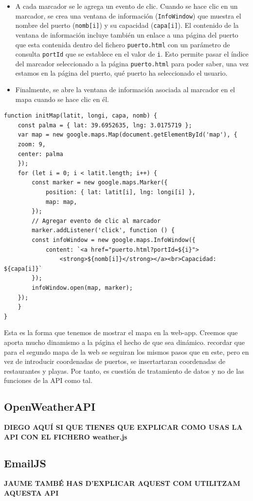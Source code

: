 \documentclass{article}
\begin{document}
\begin{enumerate}
\begin{itemize}
        \item A cada marcador se le agrega un evento de clic. Cuando se hace clic en un marcador, se crea una ventana de información (\texttt{InfoWindow}) que muestra el nombre del puerto (\texttt{nomb[i]}) y su capacidad (\texttt{capa[i]}). El contenido de la ventana de información incluye también un enlace a una página del puerto que esta contenida dentro del fichero \texttt{puerto.html} con un parámetro de consulta \texttt{portId} que se establece en el valor de \texttt{i}. Esto permite pasar el índice del marcador seleccionado a la página \texttt{puerto.html} para poder saber, una vez estamos en la página del puerto, qué puerto ha seleccionado el usuario.
        \item Finalmente, se abre la ventana de información asociada al marcador en el mapa cuando se hace clic en él.
    \end{itemize}
    \begin{verbatim}
function initMap(latit, longi, capa, nomb) {
    const palma = { lat: 39.6952635, lng: 3.0175719 };
    var map = new google.maps.Map(document.getElementById('map'), {
    zoom: 9,
    center: palma
    });
    for (let i = 0; i < latit.length; i++) {
        const marker = new google.maps.Marker({
            position: { lat: latit[i], lng: longi[i] },
            map: map,
        });
        // Agregar evento de clic al marcador
        marker.addListener('click', function () {
        const infoWindow = new google.maps.InfoWindow({
            content: `<a href="puerto.html?portId=${i}">
                <strong>${nomb[i]}</strong></a><br>Capacidad: ${capa[i]}`
        });
        infoWindow.open(map, marker);
    });
    }
}
    \end{verbatim}
\end{enumerate}
Esta es la forma que tenemos de mostrar el mapa en la web-app. Creemos que aporta mucho dinamismo a la página el hecho de que sea dinámico. recordar que para el segundo mapa de la web se seguiran los mismos pasos que en este, pero en vez de introducir coordenadas de puertos, se insertartaran coordenadas de restaurantes y playas. Por tanto, es cuestión de tratamiento de datos y no de las funciones de la API como tal.
\subsection{OpenWeatherAPI}
\textbf{DIEGO AQUÍ SI QUE TIENES QUE EXPLICAR COMO USAS LA API CON EL FICHERO weather.js}
\subsection{EmailJS}
\textbf{JAUME TAMBÉ HAS D'EXPLICAR AQUEST COM UTILITZAM AQUESTA API}
\end{document}
